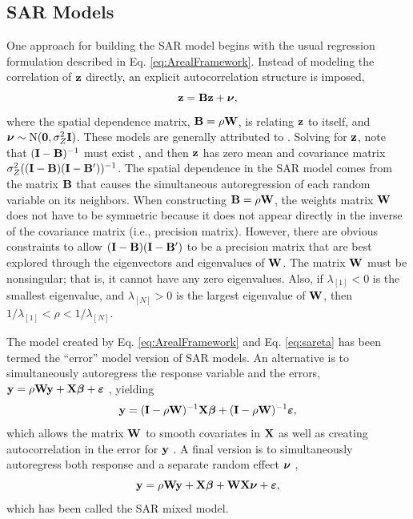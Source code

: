 \documentclass[11pt, titlepage]{article}\usepackage[]{graphicx}\usepackage[]{color}
\begin{document}
\begin{spacing}{1.9}
\begin{flushleft}

\subsection*{SAR Models}

One approach for building the SAR model begins with the usual regression formulation described in Eq. \ref{eq:ArealFramework}. Instead of modeling the correlation of $\mathbf{z}$ directly, an explicit autocorrelation structure is imposed,
\begin{equation} \label{eq:sareta}
  \mathbf{z} = \mathbf{B}\mathbf{z} + \mbox{\boldmath $\nu$},
\end{equation}
where the spatial dependence matrix, $\mathbf{B}=\rho\mathbf{W}$, is relating $\mathbf{z}$ to itself, and $\mbox{\boldmath $\nu$} \sim \textrm{N}(\mathbf{0},\sigma^2_Z \mathbf{I})$. These models are generally attributed to \citet{Whit:stat:1954}. Solving for $\mathbf{z}$, note that $(\mathbf{I} - \mathbf{B})^{-1}$ must exist \citep{Cres:stat:1993, Wall:Gotw:appl:2004}, and then $\mathbf{z}$ has zero mean and covariance matrix $\sigma^2_Z((\mathbf{I} - \mathbf{B})(\mathbf{I} - \mathbf{B}^{\prime}))^{-1}$. The spatial dependence in the SAR model comes from the matrix $\mathbf{B}$ that causes the simultaneous autoregression of each random variable on its neighbors. When constructing $\mathbf{B} = \rho\mathbf{W}$, the weights matrix $\mathbf{W}$ does not have to be symmetric because it does not appear directly in the inverse of the covariance matrix (i.e., precision matrix).  However, there are obvious constraints to allow $(\mathbf{I} - \mathbf{B})(\mathbf{I} - \mathbf{B}^{\prime})$ to be a precision matrix that are best explored through the eigenvectors and eigenvalues of $\mathbf{W}$.  The matrix $\mathbf{W}$ must be nonsingular; that is, it cannot have any zero eigenvalues. Also, if $\lambda_{[1]} < 0$ is the smallest eigenvalue, and $\lambda_{[N]} > 0$ is the largest eigenvalue of $\mathbf{W}$, then $1/\lambda_{[1]} < \rho < 1/\lambda_{[N]}$.

The model created by Eq. \ref{eq:ArealFramework} and Eq. \ref{eq:sareta} has been termed the ``error'' model version of SAR models.  An alternative is to simultaneously autoregress the response variable and the errors, $\mathbf{y}= \rho\mathbf{W}\mathbf{y} + \mathbf{X}\mbox{\boldmath $\beta$} + \mbox{\boldmath $\varepsilon$}$ \citep{Anse:spat:1988}, yielding
\begin{equation} \label{eq:SARlagResp}
   \mathbf{y} = (\mathbf{I} - \rho\mathbf{W})^{-1}\mathbf{X}\mbox{\boldmath $\beta$} + (\mathbf{I} - \rho\mathbf{W})^{-1}\mbox{\boldmath $\varepsilon$}, 
\end{equation}
which allows the matrix $\mathbf{W}$ to smooth covariates in $\mathbf{X}$ as well as creating autocorrelation in the error for $\mathbf{y}$ \citep[e.g.,][]{Hoot:Hank:John:Alld:reco:2013}. A final version is to simultaneously autoregress both response and a separate random effect $\mbox{\boldmath $\nu$}$ \citep[e.g.,][]{Kiss:Carl:spat:2008}, 
\begin{equation} \label{eq:SARlagMix}
  \mathbf{y} = \rho\mathbf{W}\mathbf{y} + \mathbf{X}\mbox{\boldmath $\beta$} + \mathbf{W}\mathbf{X}\mbox{\boldmath $\nu$} + \mbox{\boldmath $\varepsilon$},
\end{equation}
which has been called the SAR mixed model.


\end{flushleft}
\end{spacing}
\end{document}
